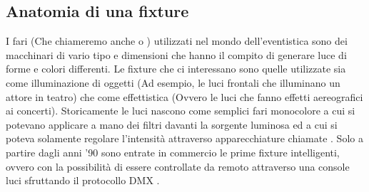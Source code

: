 \documentclass[main.tex]{subfiles}
\begin{document}
\subsection{Anatomia di una fixture}\label{subsec:fixtureAnatomy}
I fari (Che chiameremo anche  o ) utilizzati nel mondo dell'eventistica sono dei macchinari di vario tipo e dimensioni che hanno il compito di generare luce di forme e colori differenti. Le fixture che ci interessano sono quelle utilizzate sia come illuminazione di oggetti (Ad esempio, le luci frontali che illuminano un attore in teatro) che come effettistica (Ovvero le luci che fanno effetti aereografici ai concerti). Storicamente le luci nascono come semplici fari monocolore a cui si potevano applicare a mano dei filtri davanti la sorgente luminosa ed a cui si poteva solamente regolare l'intensità attraverso apparecchiature chiamate . Solo a partire dagli anni '90 sono entrate in commercio le prime fixture intelligenti, ovvero con la possibilità di essere controllate da remoto attraverso una console luci sfruttando il protocollo DMX \cite{DMX}. 
\end{document}
